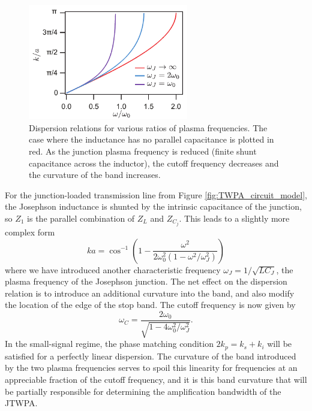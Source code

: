 \begin{figure}
\begin{center}
\includegraphics[width=2.75in]{twpa_theory/JJ_ladder_disp}
\end{center}
\caption[Dispersion relation for small-signal junction-loaded transmission line]{Dispersion relations for various ratios of plasma frequencies.  The case where the inductance has no parallel capacitance is plotted in red.  As the junction plasma frequency is reduced (finite shunt capacitance across the inductor), the cutoff frequency decreases and the curvature of the band increases.}
\label{fig:JJ_ladder_disp}
\end{figure}

For the junction-loaded transmission line from Figure \ref{fig:TWPA_circuit_model}, the Josephson inductance is shunted by the intrinsic capacitance of the junction, so $Z_1$ is the parallel combination of $Z_L$ and $Z_{C_j}$.  This leads to a slightly more complex form
\begin{equation}
ka = \cos^{-1}\left(1 - \frac{\omega^2}{2 \omega_0^2 (1 - \omega^2/\omega_J^2)}\right)
\label{eq:JJ_ladder_disp}
\end{equation}
where we have introduced another characteristic frequency $\omega_J = 1/\sqrt{L C_J}$, the plasma frequency of the Josephson junction.  The net effect on the dispersion relation is to introduce an additional curvature into the band, and also modify the location of the edge of the stop band.  The cutoff frequency is now given by
\begin{equation}
\omega_C = \frac{2 \omega_0}{\sqrt{1 - 4 \omega_0^2/\omega_J^2}}.
\label{eq:JJ_disp_cutoff}
\end{equation}
In the small-signal regime, the phase matching condition $2 k_p = k_s + k_i$ will be satisfied for a perfectly linear dispersion.  The curvature of the band introduced by the two plasma frequencies serves to spoil this linearity for frequencies at an appreciable fraction of the cutoff frequency, and it is this band curvature that will be partially responsible for determining the amplification bandwidth of the JTWPA.

